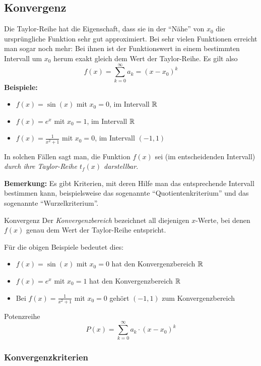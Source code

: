 \subsection{Konvergenz}\label{subsec:konvergenz}

Die Taylor-Reihe hat die Eigenschaft, dass sie in der ``Nähe'' von $x_0$ die ursprüngliche Funktion sehr gut approximiert.
Bei sehr vielen Funktionen erreicht man sogar noch mehr: Bei ihnen ist der Funktionswert in einem bestimmten Intervall um $x_0$ herum exakt gleich dem Wert der Taylor-Reihe.
Es gilt also \[f(x) = \sum_{k=0}^{\infty} a_k = (x - x_0)^k\]
\textbf{Beispiele:}
\begin{itemize}
    \item $f(x) = \sin(x)$ mit $x_0 = 0$, im Intervall $\mathbb{R}$
    \item $f(x) = e^x$ mit $x_0 = 1$, im Intervall $\mathbb{R}$
    \item $f(x) = \frac{1}{x^2 + 1}$ mit $x_0 = 0$, im Intervall $(-1,1)$
\end{itemize}

In solchen Fällen sagt man, die Funktion $f(x)$ sei (im entscheidenden Intervall) \emph{durch ihre Taylor-Reihe $t_f(x)$ darstellbar}.

\textbf{Bemerkung:} Es gibt Kriterien, mit deren Hilfe man das entsprechende Intervall bestimmen kann, beispielsweise das sogenannte ``Quotientenkriterium'' und das sogenannte ``Wurzelkriterium''.

\begin{definition}{Konvergenz}
    Der \emph{Konvergenzbereich} bezeichnet all diejenigen $x$-Werte, bei denen $f(x)$ genau dem Wert der Taylor-Reihe entspricht.
\end{definition}

Für die obigen Beispiele bedeutet dies:
\begin{itemize}
    \item $f(x) = \sin(x)$ mit $x_0 = 0$ hat den Konvergenzbereich $\mathbb{R}$
    \item $f(x) = e^x$ mit $x_0 = 1$ hat den Konvergenzbereich $\mathbb{R}$
    \item Bei $f(x) = \frac{1}{x^2 + 1}$ mit $x_0 = 0$ gehört $(-1,1)$ zum Konvergenzbereich
\end{itemize}

\begin{definition}{Potenzreihe}
    \[P(x) = \sum_{k=0}^{\infty} a_k \cdot (x - x_0)^k\]
\end{definition}

\subsubsection{Konvergenzkriterien}


